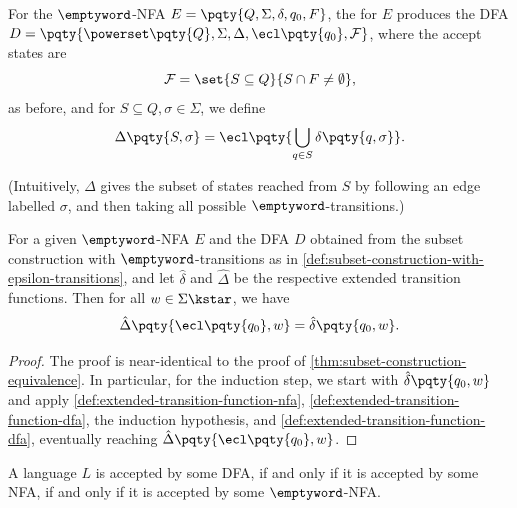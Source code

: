\begin{definition}
    \label{def:subset-construction-with-epsilon-transitions}%
    For the \(\emptyword\)-NFA \(E = \pqty{Q, \Sigma, \delta, q_0, F}\), the  for \(E\) produces the DFA \(D = \pqty{\powerset\pqty{Q}, \Sigma, \Delta, \ecl\pqty{q_0}, \mathcal{F}}\), where the accept states are
    \[
        \mathcal{F} = \set{S \subseteq Q}{S \cap F \neq \emptyset},
    \]
    as before, and for \(S \subseteq Q, \sigma \in \Sigma\), we define
    \[
        \Delta\pqty{S, \sigma} = \ecl\pqty{\bigcup_{q \in S} \delta\pqty{q, \sigma}}.
    \]

    (Intuitively, \(\Delta\) gives the subset of states reached from \(S\) by following an edge labelled \(\sigma\), and then taking all possible \(\emptyword\)-transitions.)
\end{definition}

\begin{theorem}
    For a given \(\emptyword\)-NFA \(E\) and the DFA \(D\) obtained from the subset construction with \(\emptyword\)-transitions as in \autoref{def:subset-construction-with-epsilon-transitions}, and let \(\hat{\delta}\) and \(\hat{\Delta}\) be the respective extended transition functions. Then for all \(w \in \Sigma\kstar\), we have
    \[
        \hat{\Delta}\pqty{\ecl\pqty{q_0}, w} = \hat{\delta}\pqty{q_0, w}.
    \]
\end{theorem}

\begin{proof}
    The proof is near-identical to the proof of \autoref{thm:subset-construction-equivalence}. In particular, for the induction step, we start with \(\hat{\delta}\pqty{q_0, w}\) and apply \autoref{def:extended-transition-function-nfa}, \autoref{def:extended-transition-function-dfa}, the induction hypothesis, and \autoref{def:extended-transition-function-dfa}, eventually reaching \(\hat{\Delta}\pqty{\ecl\pqty{q_0}, w}\).
\end{proof}

\begin{corollary}
    \label{cor:equivalence-of-dfas-nfas-and-epsilon-nfas}%
    A language \(L\) is accepted by some DFA, if and only if it is accepted by some NFA, if and only if it is accepted by some \(\emptyword\)-NFA.
\end{corollary}

